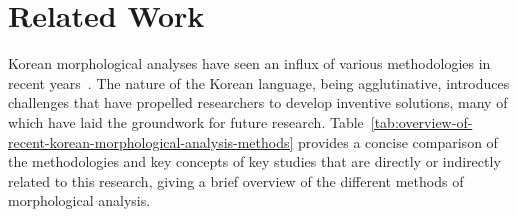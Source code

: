 \documentclass[AMS,STIX2COL]{WileyNJD-v2}
\begin{document}
    \section{Related Work}\label{sec:related-work}

    Korean morphological analyses have seen an influx of various methodologies in recent years~\cite{KwonHC1991, LeeDG2009, ShimKS2011, LeeJS2011, ShinJC2012, LeeCK2013, NaSH2014, NaSH2015, HwangHS2016, KimHM2016, ChungES2016, LeeCH2016, Li2017, NaSH2018, KimSW2018, ChoiYS2018, MinJW2018, MinJW2019, KimHM2019, SongHJ2019, MinJW2020, SongHJ2020, ChoiYS2020, HwangHS2020, KimHJ2021, YounJY2021, MinJW2022, KimJM2022, ShinHJ2023}.
    The nature of the Korean language, being agglutinative, introduces challenges that have propelled researchers to develop inventive solutions, many of which have laid the groundwork for future research.
    Table~\ref{tab:overview-of-recent-korean-morphological-analysis-methods} provides a concise comparison of the methodologies and key concepts of key studies that are directly or indirectly related to this research, giving a brief overview of the different methods of morphological analysis.
\end{document}

